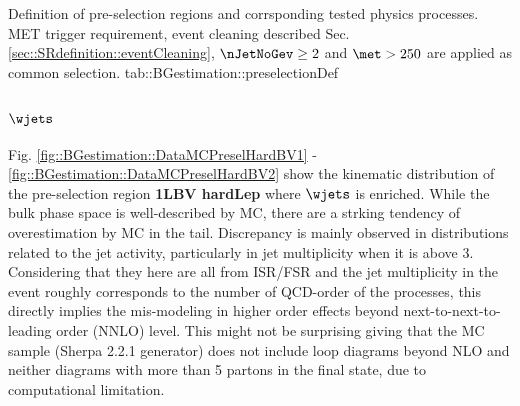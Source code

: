 {Definition of pre-selection regions and corrsponding tested physics processes. MET trigger requirement, event cleaning described Sec. \ref{sec::SRdefinition::eventCleaning}, $\nJetNoGev \geq 2$ and $\met>250$ are applied as common selection.}
{tab::BGestimation::preselectionDef}

\subsubsection{$\wjets$}
Fig. \ref{fig::BGestimation::DataMCPreselHardBV1} - \ref{fig::BGestimation::DataMCPreselHardBV2} show the kinematic distribution of the pre-selection region \textbf{1LBV hardLep} where $\wjets$ is enriched. While the bulk phase space is well-described by MC, there are a strking tendency of overestimation by MC in the tail. Discrepancy is mainly observed in distributions related to the jet activity, particularly in jet multiplicity when it is above 3. Considering that they here are all from ISR/FSR and the jet multiplicity in the event roughly corresponds to the number of QCD-order of the processes, this directly implies the mis-modeling in higher order effects beyond next-to-next-to-leading order (NNLO) level. This might not be surprising giving that the MC sample (Sherpa 2.2.1 generator) does not include loop diagrams beyond NLO and neither diagrams with more than 5 partons in the final state, due to computational limitation. \\

